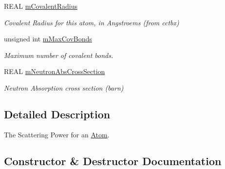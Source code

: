 \begin{DoxyCompactItemize}
\mbox{\label{class_obj_cryst_1_1_scattering_power_atom_a28ca7a9036306dbab30819ad5f132109}} 
R\+E\+AL \mbox{\hyperlink{class_obj_cryst_1_1_scattering_power_atom_a28ca7a9036306dbab30819ad5f132109}{m\+Covalent\+Radius}}
\begin{DoxyCompactList}\small\item\em Covalent Radius for this atom, in Angstroems (from cctbx) \end{DoxyCompactList}\item 
\mbox{\label{class_obj_cryst_1_1_scattering_power_atom_aec3bb2c0f5dcf800f3586780414d2c1d}} 
unsigned int \mbox{\hyperlink{class_obj_cryst_1_1_scattering_power_atom_aec3bb2c0f5dcf800f3586780414d2c1d}{m\+Max\+Cov\+Bonds}}
\begin{DoxyCompactList}\small\item\em Maximum number of covalent bonds. \end{DoxyCompactList}\item 
R\+E\+AL \mbox{\hyperlink{class_obj_cryst_1_1_scattering_power_atom_a102436222e91c85c4a55042ba73af0f5}{m\+Neutron\+Abs\+Cross\+Section}}
\begin{DoxyCompactList}\small\item\em Neutron Absorption cross section (barn) \end{DoxyCompactList}\end{DoxyCompactItemize}


\subsection{Detailed Description}
The Scattering Power for an \mbox{\hyperlink{class_obj_cryst_1_1_atom}{Atom}}. 



\subsection{Constructor \& Destructor Documentation}
\mbox{\label{class_obj_cryst_1_1_scattering_power_atom_a9e77e9d0317491d62b392b891f0329e5}} 

